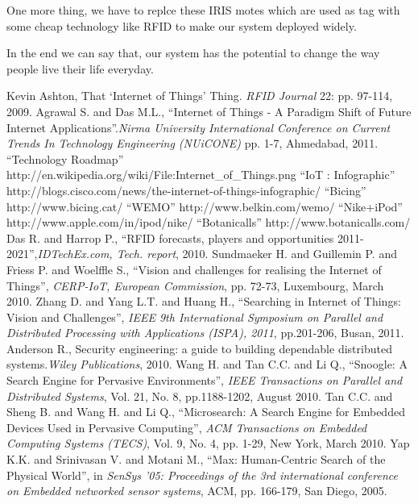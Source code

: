 \documentclass [a4paper,12pt]{book}
\begin{document}
One more thing, we have to replce these IRIS motes which are used as tag with some cheap technology like RFID to make our system deployed widely.

In the end we can say that, our system has the potential to change the way people live their life everyday.

\newpage
{}
\begin{thebibliography}{1000}
\vspace*{.5cm}

 Kevin Ashton, That `Internet of Things' Thing. {\em RFID Journal} 22: pp. 97-114, 2009.
Agrawal S. and Das M.L., ``Internet of Things - A Paradigm Shift of Future Internet Applications''.{\em Nirma University International Conference on Current Trends In Technology Engineering (NUiCONE)} pp. 1-7, Ahmedabad, 2011.
``Technology Roadmap'' http://en.wikipedia.org/wiki/File:Internet\_of\_Things.png
``IoT : Infographic'' http://blogs.cisco.com/news/the-internet-of-things-infographic/
``Bicing'' http://www.bicing.cat/
``WEMO'' http://www.belkin.com/wemo/
``Nike+iPod'' http://www.apple.com/in/ipod/nike/
``Botanicalls'' http://www.botanicalls.com/
Das R. and Harrop P., ``RFID forecasts, players and opportunities 2011-2021'',{\em IDTechEx.com, Tech. report}, 2010.
Sundmaeker H. and Guillemin P. and Friess P. and Woelffle S., ``Vision and challenges for realising the Internet of Things'', {\em CERP-IoT, European Commission}, pp. 72-73, Luxembourg, March 2010.
Zhang D. and Yang L.T. and Huang H., ``Searching in Internet of Things: Vision and Challenges'', {\em IEEE 9th International Symposium on Parallel and Distributed Processing with Applications (ISPA), 2011}, pp.201-206, Busan, 2011.
Anderson R., Security engineering: a guide to building dependable distributed systems.{\em Wiley Publications}, 2010.
Wang H. and Tan C.C. and Li Q., ``Snoogle: A Search Engine for Pervasive Environments'', {\em IEEE Transactions on Parallel and Distributed Systems}, Vol. 21, No. 8, pp.1188-1202, August 2010.
Tan C.C. and Sheng B. and Wang H. and Li Q., ``Microsearch: A Search Engine for Embedded Devices Used in Pervasive Computing'', {\em ACM Transactions on Embedded Computing Systems (TECS)}, Vol. 9, No. 4, pp. 1-29, New York, March 2010.
Yap K.K. and Srinivasan V. and Motani M., ``Max: Human-Centric Search of the Physical World'', in {\em SenSys '05: Proceedings of the 3rd international conference on Embedded networked sensor systems}, ACM, pp. 166-179, San Diego, 2005.

\end{thebibliography}
\end{document}
